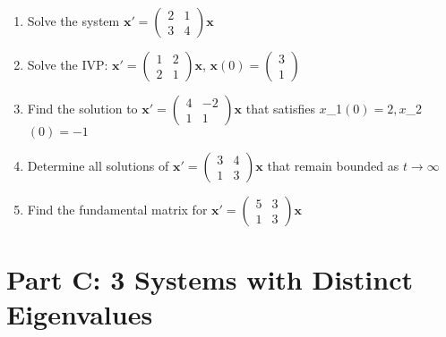 \documentclass[12pt]{article}
\begin{document}
\begin{enumerate}[start=6]
\item Solve the system $\mathbf{x}' = \begin{pmatrix} 2 & 1 \\ 3 & 4 \end{pmatrix}\mathbf{x}$

\item Solve the IVP: $\mathbf{x}' = \begin{pmatrix} 1 & 2 \\ 2 & 1 \end{pmatrix}\mathbf{x}$, $\mathbf{x}(0) = \begin{pmatrix} 3 \\ 1 \end{pmatrix}$

\item Find the solution to $\mathbf{x}' = \begin{pmatrix} 4 & -2 \\ 1 & 1 \end{pmatrix}\mathbf{x}$ that satisfies $x$_{1}$(0) = 2, x$_{2}$(0) = -1$

\item Determine all solutions of $\mathbf{x}' = \begin{pmatrix} 3 & 4 \\ 1 & 3 \end{pmatrix}\mathbf{x}$ that remain bounded as $t \to \infty$

\item Find the fundamental matrix for $\mathbf{x}' = \begin{pmatrix} 5 & 3 \\ 1 & 3 \end{pmatrix}\mathbf{x}$
\end{enumerate}

\section*{Part C: 3 Systems with Distinct Eigenvalues}
\end{document}
